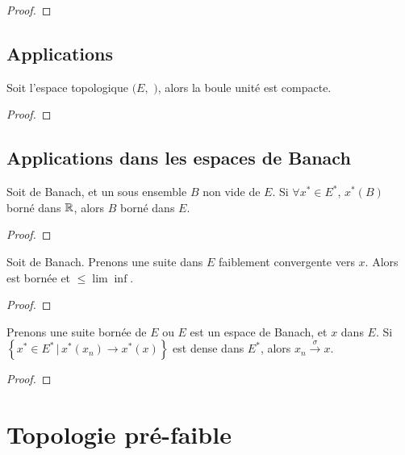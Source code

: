 \begin{proof}
	
\end{proof}

\subsection{Applications}

\begin{theorem}
	Soit l'espace topologique $(E,$ $)$, alors la boule unité
	est compacte.
\end{theorem}

\begin{proof}
	
\end{proof}

\subsection{Applications dans les espaces de Banach}

\begin{proposition}
	Soit  de Banach, et un sous ensemble $B$ non
	vide de $E$.
	Si $\forall x^{*} \in E^{*}$, $x^{*}(B)$ borné dans $\mathbb{R}$, alors $B$ borné
	dans $E$.
\end{proposition}

\begin{proof}
	
\end{proof}

\begin{corollary}
	Soit  de Banach.
	Prenons une suite  dans $E$ faiblement
	convergente vers $x$.
	Alors  est bornée et  $\leq
	\lim\inf$.
\end{corollary}

\begin{proof}
	
\end{proof}

\begin{proposition}
	Prenons une suite bornée de $E$ ou $E$ est un espace de Banach, et $x$ dans
	$E$.
	Si $\left\{ x^{*} \in E^{*} \, | \, x^{*}(x_{n}) \rightarrow x^{*}(x)
\right\}$ est dense dans $E^{*}$, alors $x_{n} \xrightarrow{\sigma} x$.
\end{proposition}

\begin{proof}
	
\end{proof}

\section{Topologie pré-faible}
